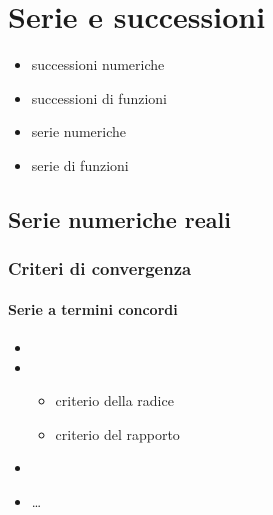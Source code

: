 \documentclass[letterpaper,10pt,english]{jupyterBook}
\begin{document}
\chapter{Serie e successioni}
\label{\detokenize{ch/series:serie-e-successioni}}\label{\detokenize{ch/series:math-hs-series}}\label{\detokenize{ch/series::doc}}\begin{itemize}
\item {} 
\sphinxAtStartPar
successioni numeriche

\item {} 
\sphinxAtStartPar
successioni di funzioni

\item {} 
\sphinxAtStartPar
serie numeriche

\item {} 
\sphinxAtStartPar
serie di funzioni

\end{itemize}


\section{Serie numeriche reali}
\label{\detokenize{ch/series:serie-numeriche-reali}}
\sphinxAtStartPar
{}


\subsection{Criteri di convergenza}
\label{\detokenize{ch/series:criteri-di-convergenza}}

\subsubsection{Serie a termini concordi}
\label{\detokenize{ch/series:serie-a-termini-concordi}}\begin{itemize}
\item {} 
\sphinxAtStartPar
{}

\item {} 
\sphinxAtStartPar
{}
\begin{itemize}
\item {} 
\sphinxAtStartPar
criterio della radice

\item {} 
\sphinxAtStartPar
criterio del rapporto

\end{itemize}

\item {} 
\sphinxAtStartPar
{}

\item {} 
\sphinxAtStartPar
…

\end{itemize}
\end{document}
